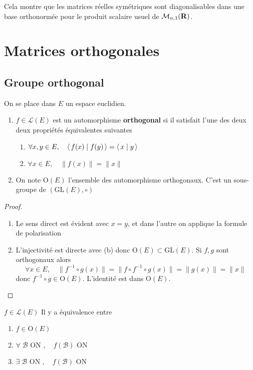 \begin{rem}
    Cela montre que les matrices réelles symétriques sont diagonalisables dans une base orthonormée pour le produit scalaire usuel de $ \mathcal  M_{n,1}(\mathbf R)$.
\end{rem}

\section{Matrices orthogonales}

\subsection{Groupe orthogonal}
On se place dans $E$ un espace euclidien.

 \begin{thmdef}
\begin{enumerate}
    \item $f \in  \mathcal  L(E)$ est un automorphisme \textbf{orthogonal} si il satisfait l'une des deux deux propriétés équivalentes suivantes \begin{enumerate}
        \item $ \forall  x, y \in  E, \quad  \scalar{f(x)}{f(y)}= \scalar{x}{y}$
        \item $\forall  x \in  E, \quad  \|f(x)\|=\|x\|$
    \end{enumerate}
\item On note $\mathrm  O(E)$ l'ensemble des automorphisme orthogonaux. C'est un sous-groupe de $(\mathrm {GL}(E), \circ)$
\end{enumerate}
\end{thmdef}

\begin{proof}
\begin{enumerate}
    \item Le sens direct est évident avec $x=y$, et dans l'autre on applique la formule de polarisation
    \item L'injectivité est directe avec (b) donc  $\mathrm O(E)\subset \mathrm {GL}(E)$. Si $f, g$ sont orthogonaux alors  \[
            \forall  x \in  E, \quad  \|f^{-1}\circ g(x)\|=\|f\circ f^{-1}\circ g(x)\|=\|g(x)\|=\|x\|
    \] 
    donc $f^{-1}\circ g \in \mathrm O(E)$. L'identité est dans $\mathrm  O(E)$.
\end{enumerate}
\end{proof}

\begin{thm}
    \Hyp $f \in  \mathcal  L(E)$
    \Conc Il y a équivalence entre \begin{enumerate}
        \item $f \in  \mathrm   O(E)$
        \item  $ \forall  \;\mathcal  B \text{ ON }, \quad  f(\mathcal B) \text{ ON }$
        \item  $ \exists  \;\mathcal  B \text{ ON }, \quad  f(\mathcal B) \text{ ON }$
    \end{enumerate}
\end{thm}

